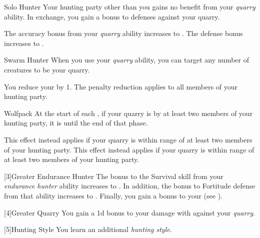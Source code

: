 {            \begin{freeability}{Solo Hunter}
                Your hunting party other than you gains no benefit from your \textit{quarry} ability.
                In exchange, you gain a  bonus to defenses against your quarry.

                \rankline
                 The accuracy bonus from your \textit{quarry} ability increases to .
                 The defense bonus increases to .
            \end{freeability}

            \begin{freeability}{Swarm Hunter}
                When you use your \textit{quarry} ability, you can target any number of creatures to be your quarry.

                \rankline
                 You reduce your  by 1.
                 The penalty reduction applies to all members of your hunting party.
            \end{freeability}

            \begin{freeability}{Wolfpack}
                At the start of each , if your quarry is  by at least two members of your hunting party, it is  until the end of that phase.

                \rankline
                 This effect instead applies if your quarry is within \rngmed range of at least two members of your hunting party.
                 This effect instead applies if your quarry is within \rnglong range of at least two members of your hunting party.
            \end{freeability}
        }

        [3]{Greater Endurance Hunter} The bonus to the Survival skill from your \textit{endurance hunter} ability increases to .
        In addition, the bonus to Fortitude defense from that ability increases to .
        Finally, you gain a  bonus to your  (see ).

        [4]{Greater Quarry} You gain a \plus1d bonus to your damage with  against your \textit{quarry}.

        [5]{Hunting Style}
        You learn an additional \textit{hunting style}.


